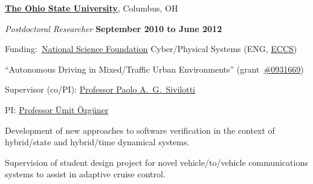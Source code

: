 \documentclass[10pt]{article}           %
\newcommand{\entry}{\item[{}]}
\newcommand{\marker}[2]{\item[\mathalt{#1}{#2}]}
\newcommand{\mathalt}[2]{#2}
\newcommand{\halfblankline}{\quad\vspace{-0.5\baselineskip}\pagebreak[3]}
\begin{document}
\halfblankline

\href{http://www.osu.edu/}{\textbf{The Ohio State University}},
Columbus, OH
\begin{cvlist}[loose]

    \entry \textit{Postdoctoral Researcher}%
            \hfill \textbf{September 2010 to June 2012}
    \begin{cvlist}
        \item Funding:~\href{http://www.nfs.gov/}{National Science Foundation} Cyber\-/Physical Systems (ENG, \href{http://www.nsf.gov/div/index.jsp?div=eccs}{ECCS})
        \begin{cvlist}
            \marker{dash}{$-$} ``Autonomous Driving in Mixed\-/Traffic Urban Environments''
                (grant~\href{http://www.nsf.gov/awardsearch/showAward.do?AwardNumber=0931669}{\#0931669})
            \marker{dash}{$-$} Supervisor (co\-/PI):
                \href{http://www.cse.ohio-state.edu/~paolo/}%
                     {Professor Paolo A.~G.~Sivilotti}
            \marker{dash}{$-$} PI:
                \href{http://www.ece.ohio-state.edu/~umit/}%
                     {Professor \"{U}mit \"{O}zg\"{u}ner}
        \end{cvlist}

        \item Development of new approaches to software
            verification in the context of hybrid\-/state and
            hybrid\-/time dynamical systems.

        \item Supervision of student design project for
            novel vehicle\-/to\-/vehicle communications
            systems to assist in adaptive cruise control.
    \end{cvlist}

\end{cvlist}

\halfblankline
\end{document}
